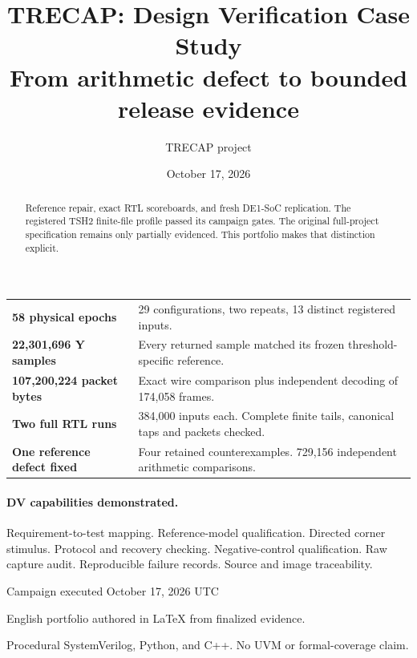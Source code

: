 \documentclass[11pt,letterpaper]{article}
\title{\LARGE\bfseries TRECAP: Design Verification Case Study\\[0.5em]
\Large From arithmetic defect to bounded release evidence}
\author{TRECAP project}
\date{October 17, 2026}
\begin{document}
\maketitle
\thispagestyle{plain}
\begin{abstract}
Reference repair, exact RTL scoreboards, and fresh DE1-SoC replication.
The registered TSH2 finite-file profile passed its campaign gates. The original full-project specification remains only partially evidenced. This portfolio makes that distinction explicit.
\end{abstract}
\medskip
\par\noindent\begin{minipage}{\linewidth}
\noindent\begin{tabularx}{\linewidth}{P{1.48in}L}
\toprule
\textbf{58 physical epochs} & 29 configurations, two repeats, 13 distinct registered inputs.\\
\textbf{22,301,696 Y samples} & Every returned sample matched its frozen threshold-specific reference.\\
\textbf{107,200,224 packet bytes} & Exact wire comparison plus independent decoding of 174,058 frames.\\
\textbf{Two full RTL runs} & 384,000 inputs each. Complete finite tails, canonical taps and packets checked.\\
\textbf{One reference defect fixed} & Four retained counterexamples. 729,156 independent arithmetic comparisons.\\
\bottomrule
\end{tabularx}\par\end{minipage}\par
\vspace{0.14in}
\paragraph{DV capabilities demonstrated.}
Requirement-to-test mapping. Reference-model qualification. Directed corner stimulus. Protocol and recovery checking. Negative-control qualification. Raw capture audit. Reproducible failure records. Source and image traceability.
\vfill
{\small\noindent Campaign executed October 17, 2026 UTC\par
English portfolio authored in LaTeX from finalized evidence.\par
Procedural SystemVerilog, Python, and C++. No UVM or formal-coverage claim.}
\end{document}
